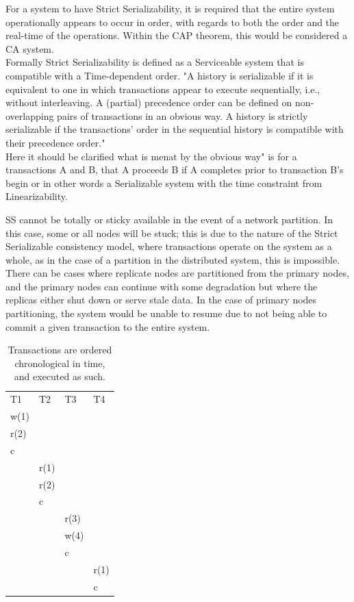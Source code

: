 \documentclass[a4paper,10pt,titlepage]{report}
\begin{document}
For a system to have Strict Serializability, it is required that the entire system operationally appears to occur in order, with regards to both the order and the real-time of the operations. Within the CAP theorem, this would be considered a CA system.\\
\vspace{5mm}
Formally Strict Serializability is defined as a Serviceable system that is compatible with a Time-dependent order.
"A history is serializable if it is equivalent to one in which transactions appear to execute sequentially, i.e., without interleaving. A (partial) precedence order can be defined on non-overlapping pairs of transactions in an obvious way. A history is strictly serializable if the transactions' order in the sequential history is compatible with their precedence order." \cite{Herlihy1990Linearizability}\\
\vspace{5mm}
Here it should be clarified what is menat by the obvious way" is for a transactions A and B, that A proceeds B if A completes prior to transaction B's begin or in other words a Serializable system with the time constraint from Linearizability.

SS cannot be totally or sticky available in the event of a network partition. In this case, some or all nodes will be stuck; this is due to the nature of the Strict Serializable consistency model, where transactions operate on the system as a whole, as in the case of a partition in the distributed system, this is impossible. There can be cases where replicate nodes are partitioned from the primary nodes, and the primary nodes can continue with some degradation but where the replicas either shut down or serve stale data. In the case of primary nodes partitioning, the system would be unable to resume due to not being able to commit a given transaction to the entire system.


\begin{table}[h]
    \begin{tabular}{l|l|l|l}
        T1   & T2   & T3   & T4   \\
        w(1) &      &      &      \\
        r(2) &      &      &      \\
        c    &      &      &      \\
        & r(1) &      &      \\
        & r(2) &      &      \\
        & c    &      &      \\
        &      & r(3) &      \\
        &      & w(4) &      \\
        &      & c    &      \\
        &      &      & r(1) \\
        &      &      & c
    \end{tabular}
    \caption{Transactions are ordered chronological in time, and executed as such.}
\end{table}
\end{document}
